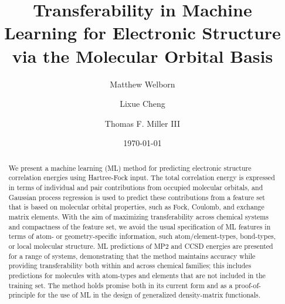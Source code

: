 \documentclass[%
 aps,
 prb,
 twocolumn,
%
 reprint,%
%
citeautoscript,
%
showkeys
]{revtex4-1}
\begin{document}
%

\title[]{Transferability in Machine Learning for Electronic Structure\\ via the Molecular Orbital Basis} %
%

\author{Matthew Welborn}
%
\author{Lixue Cheng}%

%
%
%

\author{Thomas F. Miller III}
%
%

\date{\today}%

\begin{abstract}
We present a machine learning (ML) method for  predicting   electronic structure correlation energies using Hartree-Fock input.  
The total correlation energy is expressed in terms of individual and pair contributions from occupied molecular orbitals, and 
Gaussian process regression is used to predict these %
contributions from a feature set that is based on molecular orbital properties, such as Fock, Coulomb, and exchange matrix elements.
With the aim of  maximizing transferability across chemical systems and compactness of the feature set, we avoid the usual specification of ML features in terms of atom- or geometry-specific information, such atom/element-types, bond-types, or local molecular structure. 
ML predictions of MP2 and CCSD energies are presented for a range of systems, demonstrating that the method maintains accuracy while providing transferability both within and across chemical families; this includes   predictions for molecules with atom-types and elements that are not included in the training set. 
The method 
holds promise both in its current form and as a proof-of-principle for the use of ML in the  design of  %
generalized density-matrix functionals. 
%

%



%
%
\end{abstract}

%
\maketitle

%
%
%
%
%

%
\end{document}
